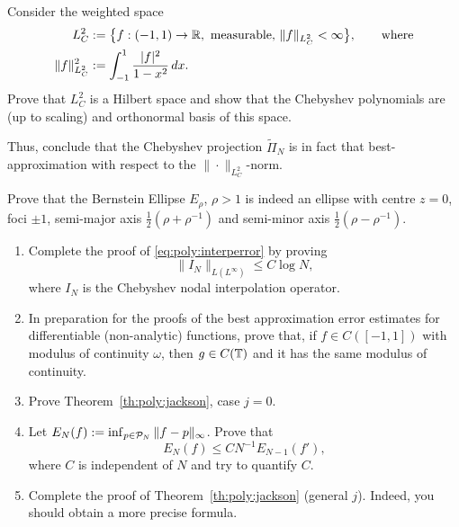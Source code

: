 \begin{exercise}[Orthogonality of $T_k$]
   Consider the weighted space 
   \begin{align*}
      L^2_C &:= \big\{ f : (-1,1) \to \mathbb{R}, \text{ measurable, } 
            \|f\|_{L^2_C} < \infty \big\}, \qquad 
            \text{where} \\  
      \|f\|_{L^2_C}^2 &:= \int_{-1}^1 \frac{|f|^2}{1 - x^2} \,dx.
   \end{align*}
   Prove that $L^2_C$ is a Hilbert space and show that the Chebyshev 
   polynomials are (up to scaling) and orthonormal basis of this space. 

   Thus, conclude that the Chebyshev projection $\tilde\Pi_N$ is in fact that 
   best-approximation with respect to the $\|\cdot\|_{L^2_C}$-norm. 
\end{exercise}

\begin{exercise} 
   \label{exr:poly:ellipse}
   Prove that the Bernstein Ellipse $E_\rho$, $\rho > 1$ is indeed an ellipse
   with centre $z = 0$, foci $\pm 1$, semi-major axis $\frac12 (\rho+\rho^{-1})$
   and semi-minor axis $\frac12 (\rho-\rho^{-1})$.
\end{exercise}



\begin{exercise}
   \label{exr:poly:convergence}
   \begin{enumerate} \ilist
   \item Complete the proof of \eqref{eq:poly:interperror} by proving
      \[
         \| I_N \|_{L(L^\infty)} \leq C \log N,
      \]
      where $I_N$ is the Chebyshev nodal interpolation operator.

   \item In preparation for the proofs of the best approximation error estimates
      for differentiable (non-analytic) functions, prove that, if $f \in
      C([-1,1])$ with modulus of continuity $\omega$, then $g \in C(\mathbb{T})$ and it
      has the same modulus of continuity.

   \item Prove Theorem~\ref{th:poly:jackson}, case $j = 0$.

   \item Let $E_N(f) := \inf_{p \in \mathcal{P}_N} \|f - p\|_\infty$. Prove that 
      \[
         E_N(f)  \leq C N^{-1} E_{N-1}(f'),
      \]
      where $C$ is independent of $N$ and try to quantify $C$.

   \item Complete the proof of Theorem~\ref{th:poly:jackson} (general $j$).
   Indeed, you should obtain a more precise formula.
   \end{enumerate}
\end{exercise}

